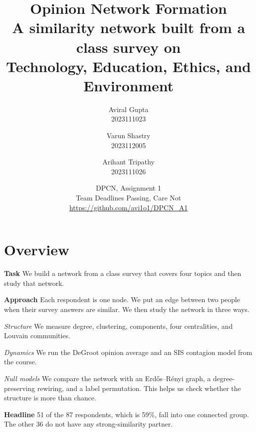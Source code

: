 \documentclass[11pt,a4paper]{article}
\newcommand{\team}{Deadlines Passing, Care Not}
\newcommand{\lab}[1]{\textbf{#1}}
\begin{document}
\title{Opinion Network Formation \\[0.35em]
  \large\normalfont A similarity network built from a class survey on \\
  Technology, Education, Ethics, and Environment}

\author{%
  Aviral Gupta \\[-0.15em] \small 2023111023
  \and
  Varun Shastry \\[-0.15em] \small 2023112005
  \and
  Arihant Tripathy \\[-0.15em] \small 2023111026}

\date{DPCN, Assignment 1 \\[0.2em]
  Team \team \\[0.2em]
  \url{https://github.com/avi1o1/DPCN_A1}}

\maketitle

\section*{Overview}

\lab{Task} We build a network from a class survey that covers four topics and
then study that network.

\lab{Approach} Each respondent is one node. We put an edge between two people
when their survey answers are similar. We then study the network in three ways.

\begin{dash}
  \item \emph{Structure} We measure degree, clustering, components, four
  centralities, and Louvain communities.
  \item \emph{Dynamics} We run the DeGroot opinion average and an SIS
  contagion model from the course.
  \item \emph{Null models} We compare the network with an
  Erd\H{o}s--R\'enyi graph, a degree-preserving rewiring, and a label
  permutation. This helps us check whether the structure is more than chance.
\end{dash}

\lab{Headline} 51 of the 87 respondents, which is 59\%, fall into one
connected group. The other 36 do not have any strong-similarity partner.
\end{document}

